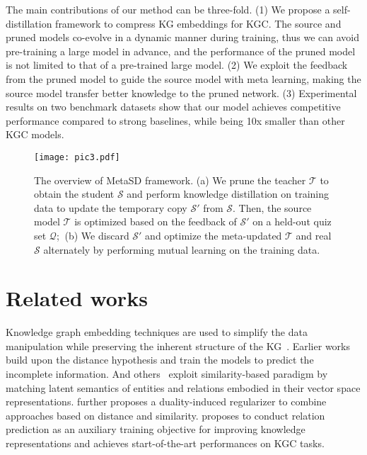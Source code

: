\documentclass[11pt]{article}
\begin{document}
The main contributions of our method can be three-fold. 
(1) We propose a self-distillation framework to compress KG embeddings for KGC. The source and pruned models co-evolve in a dynamic manner during training, thus we can avoid pre-training a large model in advance, and the performance of the pruned model is not limited to that of a pre-trained large model.
(2) We exploit the feedback from the pruned model to guide the source model with meta learning, making the source model transfer better knowledge to the pruned network. 
(3)  Experimental results on two benchmark datasets show that our model achieves competitive performance compared to strong baselines, while being 10x smaller than other KGC models. 


















\begin{figure*}[]
\centering \texttt{[image: pic3.pdf]}
\caption{The overview of MetaSD framework. (a) We prune the teacher $\mathcal{T}$ to obtain the student $\mathcal{S}$ and perform knowledge distillation on training data to update the temporary copy $\mathcal{S}'$ from $\mathcal{S}$. Then, the source model $\mathcal{T}$ is optimized based on the feedback of $\mathcal{S}'$ on a held-out quiz set $\mathcal{Q}$;$\ $ (b) We discard $\mathcal{S}'$ and optimize  the meta-updated $\mathcal{T}$ and real $\mathcal{S}$ alternately by performing mutual learning on the training data.}
\label{fig:figure1}
\end{figure*}






\iffalse
\section{Related works}
Knowledge graph embedding techniques are used to simplify the data manipulation while preserving the inherent structure of the KG~\citep{wang2017knowledge}. Earlier works~\citep{bordes2013translating,sun2019rotate} build upon the distance hypothesis and train the models to predict the incomplete information. And others~\citep{hit1927,nickel2011three,yang2014embedding,trouillon2016complex} exploit similarity-based paradigm by matching latent semantics of entities and relations embodied in their vector space representations. \citet{zhang2020duality} further  proposes a duality-induced regularizer to combine approaches based on distance and similarity. \citet{chen2021relation} proposes to conduct relation prediction as an auxiliary training objective for improving knowledge representations and achieves start-of-the-art performances on KGC tasks.
\end{document}
